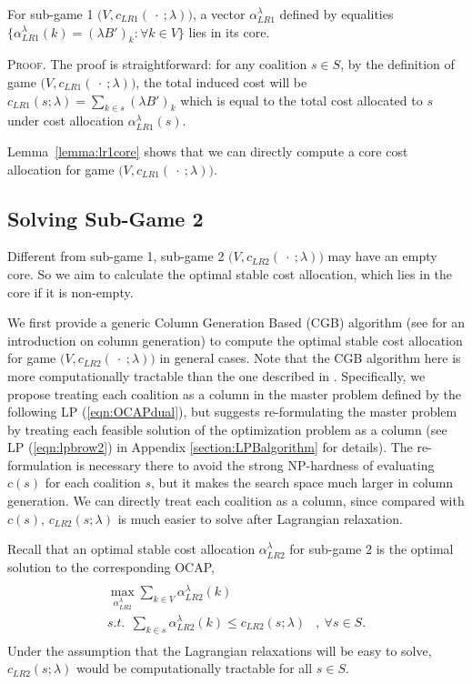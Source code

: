 \documentclass[ijoc,nonblindrev]{informs3} %
\begin{document}
\begin{lemma}\label{lemma:lr1core}
For sub-game 1 $\big(V,c_{LR1}(\ \cdot\ ;\lambda)\big)$, a vector $\alpha_{LR1}^{\lambda}$ defined by equalities $\{\alpha_{LR1}^{\lambda}(k) = (\lambda B')_k:\forall k \in V \}$ lies in its core.
\end{lemma}
{\scshape Proof.}
The proof is straightforward: for any coalition $s \in S$, by the definition of game $\big(V,c_{LR1}(\ \cdot\ ;\lambda)\big)$, the total induced cost will be $c_{LR1}(s;\lambda) = \sum_{k \in s} (\lambda B')_k$ which is equal to the total cost allocated to $s$ under cost allocation $\alpha_{LR1}^{\lambda}(s)$.
\hfill\Halmos

Lemma~\ref{lemma:lr1core} shows that we can directly compute a core cost allocation for game $\big(V,c_{LR1}(\ \cdot\ ;\lambda)\big)$.


\subsection{Solving Sub-Game 2}
\label{sec:sub-game-2}
Different from sub-game 1,  sub-game 2 $\big(V,c_{LR2}(\ \cdot\ ;\lambda)\big)$ may have an empty core. So we aim to calculate the optimal stable cost allocation, which lies in the core if it is non-empty. 


We first provide a generic   Column Generation Based (CGB) algorithm (see \citealt{Barnhart1998CGB2} for an introduction on column generation) to compute the optimal stable cost allocation for game $\big(V,c_{LR2}(\ \cdot \ ;\lambda)\big)$ in general cases. Note that the CGB algorithm here is more computationally tractable  than the one described in \cite{Caprara2010LPB}. 
Specifically, we propose treating each coalition as a column in the master problem defined by the following LP (\ref{eqn:OCAPdual}), but \cite{Caprara2010LPB} suggests re-formulating the master problem by treating each feasible solution of the optimization problem as a column (see LP (\ref{eqn:lpbrow2}) in Appendix \ref{section:LPBalgorithm} for details). 
The re-formulation is necessary there to avoid the strong NP-hardness of evaluating $c(s)$ for each coalition $s$, but it makes the search space much larger in column generation. We can directly treat each coalition as a column, since compared with $c(s)$, $c_{LR2}(s;\lambda)$ is much easier to solve after Lagrangian relaxation. 


Recall that an optimal stable cost allocation $\alpha_{LR2}^{\lambda}$ for sub-game 2 is the optimal solution to the corresponding OCAP,
\begin{eqnarray}\label{eqn:OCAPorg}
\begin{aligned}
\begin{split}
\max_{\alpha_{LR2}^{\lambda}} \sum_{k \in V} \alpha_{LR2}^{\lambda}(k)&\\
s.t.~~ \sum_{k \in s} \alpha_{LR2}^{\lambda}(k) \leq  c_{LR2}(s;\lambda)&,~ \forall s \in S.
\end{split}
\end{aligned}
\end{eqnarray}
Under the assumption that the Lagrangian relaxations will be easy to solve, $c_{LR2}(s;\lambda)$ would be computationally tractable for all $s \in S$. 
\end{document}
